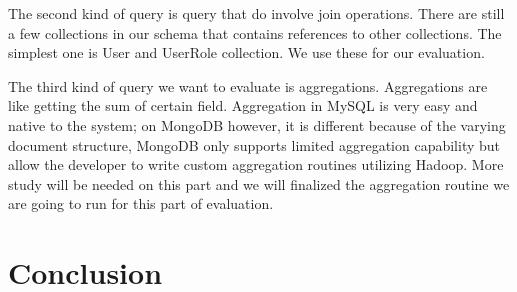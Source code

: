 The second kind of query is query that do involve join operations. There are still a few collections in our schema that contains references to other collections. The simplest one is User and UserRole collection. We use these for our evaluation.

The third kind of query we want to evaluate is aggregations. Aggregations are like getting the sum of certain field. Aggregation in MySQL is very easy and native to the system; on MongoDB however, it is different because of the varying document structure, MongoDB only supports limited aggregation capability but allow the developer to write custom aggregation routines utilizing Hadoop. More study will be needed on this part and we will finalized the aggregation routine we are going to run for this part of evaluation.

\section{Conclusion}


